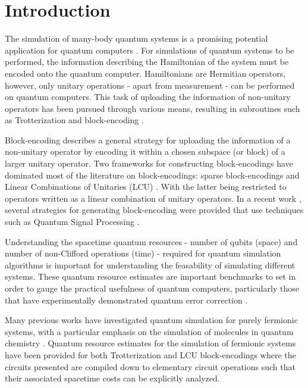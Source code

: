 \section{Introduction}
\label{sec:intro}

The simulation of many-body quantum systems is a promising potential application for quantum computers \cite{feynman2018simulating}.
For simulations of quantum systems to be performed, the information describing the Hamiltonian of the system must be encoded onto the quantum computer.
Hamiltonians are Hermitian operators, however, only unitary operations - apart from measurement - can be performed on quantum computers. 
This task of uploading the information of non-unitary operators has been pursued through various means, resulting in subroutines such as Trotterization \cite{suzuki1976generalized,hatano2005finding,lie1893theorie,trotter1959product,childs2021theory} and block-encoding \cite{lin2022lecture, poulin2018quantum, low2019hamiltonian}.

Block-encoding describes a general strategy for uploading the information of a non-unitary operator by encoding it within a chosen subspace (or block) of a larger unitary operator.
Two frameworks for constructing block-encodings have dominated most of the literature on block-encodings: sparse block-encodings \cite{berry2009black, childs2009universal, lin2022lecture} and Linear Combinations of Unitaries (LCU) \cite{childs2012hamiltonian}.
With the latter being restricted to operators written as a linear combination of unitary operators.
In a recent work \cite{kane2024block}, several strategies for generating block-encoding were provided that use techniques such as Quantum Signal Processing \cite{low2017optimal}.

Understanding the spacetime quantum resources - number of qubits (space) and number of non-Clifford operations (time) - required for quantum simulation algorithms is important for understanding the feasability of simulating different systems.
These quantum resource estimates are important benchmarks to set in order to gauge the practical usefulness of quantum computers, particularly those that have experimentally demonstrated quantum error correction \cite{bluvstein2024logical, acharya2024quantum}.

Many previous works have investigated quantum simulation for purely fermionic systems, with a particular emphasis on the simulation of molecules in quantum chemistry \cite{aspuru2005simulated, peruzzo2014variational, babbush2014adiabatic, o2016scalable, babbush2018encoding, google2020hartree, lee2021even}.
Quantum resource estimates for the simulation of fermionic systems have been provided for both Trotterization \cite{kivlichan2020improved, campbell2021early} and LCU block-encodings \cite{babbush2018encoding,lee2021even} where the circuits presented are compiled down to elementary circuit operations such that their associated spacetime costs can be explicitly analyzed.

